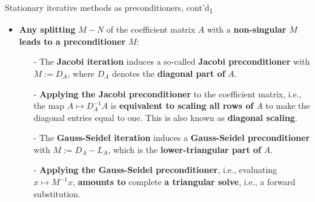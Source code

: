 \documentclass[t,usepdftitle=false]{beamer}
\begin{document}
\begin{frame}{Stationary iterative methods as preconditioners, cont'd\textsubscript{1}}
\begin{itemize}
\item \textbf{Any splitting} $M-N$ of the coefficient matrix $A$ with a \textbf{non-singular} $M$ \textbf{leads to a preconditioner} $M$:
\begin{definition}
\begin{itemize}\normalsize
\item[-] The \textbf{Jacobi iteration} induces a so-called \textbf{Jacobi preconditioner} with $M:=D_A$, where $D_A$ denotes the \textbf{diagonal part of} $A$.
\item[-] \textbf{Applying the Jacobi preconditioner} to the coefficient matrix, i.e., the map $A\mapsto D_A^{-1}A$ is \textbf{equivalent to scaling all rows of} $A$ to make the diagonal entries equal to one. 
This is also known as \textbf{diagonal scaling}.
\end{itemize}
\end{definition}
\begin{definition}
\begin{itemize}\normalsize
\item[-] The \textbf{Gauss-Seidel iteration} induces a \textbf{Gauss-Seidel preconditioner} with $M:=D_A-L_A$, which is the \textbf{lower-triangular part of} $A$.
\item[-] \textbf{Applying the Gauss-Seidel preconditioner}, i.e., evaluating $x\mapsto M^{-1}x$, \textbf{amounts to} complete \textbf{a triangular solve}, i.e., a forward substitution.
\end{itemize}
\end{definition}
\end{itemize}
\end{frame}
\end{document}
